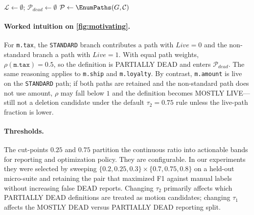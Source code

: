 \documentclass[acmsmall,screen,review,anonymous]{acmart}
\begin{document}
\begin{algobox}
\begin{algorithm}[H]
\SetAlgoLined
{}
$\mathcal{L}\leftarrow\emptyset$;\;
$\mathcal{P}_{dead}\leftarrow\emptyset$\;
$\mathcal{P}\leftarrow\EnumPaths(G,\mathcal{C})$\;
\;
\caption{Path-aware PDE detection (classification core).}
\label{alg:pde}
\end{algorithm}
\end{algobox}

\paragraph{Worked intuition on \autoref{fig:motivating}.}
For \texttt{m.tax}, the \texttt{STANDARD} branch contributes a path with $\mathit{Live}=0$ and the non-standard branch a path with $\mathit{Live}=1$. With equal path weights, $\rho(\texttt{m.tax})=0.5$, so the definition is PARTIALLY DEAD and enters $\mathcal{P}_{dead}$. The same reasoning applies to \texttt{m.ship} and \texttt{m.loyalty}. By contrast, \texttt{m.amount} is live on the \texttt{STANDARD} path; if both paths are retained and the non-standard path does not use amount, $\rho$ may fall below $1$ and the definition becomes MOSTLY LIVE---still not a deletion candidate under the default $\tau_2=0.75$ rule unless the live-path fraction is lower.

\paragraph{Thresholds.}
The cut-points $0.25$ and $0.75$ partition the continuous ratio into actionable bands for reporting and optimization policy. They are configurable. In our experiments they were selected by sweeping $\{0.2,0.25,0.3\}\times\{0.7,0.75,0.8\}$ on a held-out micro-suite and retaining the pair that maximized F1 against manual labels without increasing false DEAD reports. Changing $\tau_2$ primarily affects which PARTIALLY DEAD definitions are treated as motion candidates; changing $\tau_1$ affects the MOSTLY DEAD versus PARTIALLY DEAD reporting split.
\end{document}
